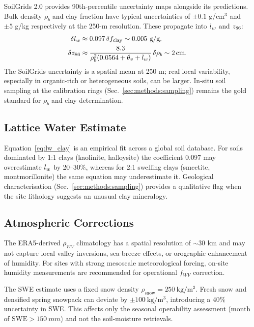 SoilGrids 2.0 provides 90th-percentile uncertainty maps alongside
its predictions.
Bulk density $\rho_b$ and clay fraction have typical uncertainties
of $\pm 0.1$ g/cm$^3$ and $\pm 5$ g/kg respectively at the
250-m resolution.
These propagate into $l_w$ and $z_{86}$:
\begin{align*}
  \delta l_w   &\approx 0.097\,\delta f_\mathrm{clay} \sim 0.005 \text{ g/g},\\
  \delta z_{86}  &\approx \frac{8.3}{\rho_b^2 (0.0564+\theta_v+l_w)}\,\delta\rho_b
               \sim \SI{2}{cm}.
\end{align*}
The SoilGrids uncertainty is a spatial mean at 250 m; real local
variability, especially in organic-rich or heterogeneous soils, can
be larger.
In-situ soil sampling at the calibration rings (Sec.~\ref{sec:methods:sampling})
remains the gold standard for $\rho_b$ and clay determination.

\subsection{Lattice Water Estimate}

Equation~\eqref{eq:lw_clay} is an empirical fit across a global
soil database.
For soils dominated by 1:1 clays (kaolinite, halloysite) the
coefficient 0.097 may overestimate $l_w$ by 20–30\%, whereas for
2:1 swelling clays (smectite, montmorillonite) the same equation
may underestimate it.
Geological characterisation (Sec.~\ref{sec:methods:sampling}) provides
a qualitative flag when the site lithology suggests an unusual
clay mineralogy.

\subsection{Atmospheric Corrections}

The ERA5-derived $\rho_{WV}$ climatology has a spatial resolution
of $\sim$30 km and may not capture local valley inversions, sea-breeze
effects, or orographic enhancement of humidity.
For sites with strong mesoscale meteorological forcing, on-site
humidity measurements are recommended for operational $f_{WV}$ correction.

The SWE estimate uses a fixed snow density $\rho_\mathrm{snow} =
\SI{250}{\kilo\gram\per\cubic\metre}$.
Fresh snow and densified spring snowpack can deviate by
$\pm\SI{100}{\kilo\gram\per\cubic\metre}$, introducing a 40\%
uncertainty in SWE.
This affects only the seasonal operability assessment (month of
$\mathrm{SWE} > \SI{150}{mm}$) and not the soil-moisture retrievals.

